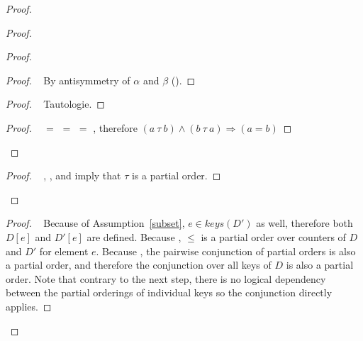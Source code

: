 \documentclass[10pt, oneside]{article}   	%
\begin{document}
\begin{proof}
\begin{proof}
\begin{proof}
				\begin{proof}
					\pf~ By antisymmetry of $\alpha$ and $\beta$ ().
				\end{proof}
				
				\begin{proof}
					\pf~ Tautologie.
				\end{proof}
				
				\qedstep
				\begin{proof}
					\pf~   $=$  $=$  $=$ , therefore $(a ~\tau~ b) \wedge (b ~\tau~ a) \Rightarrow  (a=b)$
				\end{proof}
			\end{proof}
			
			\qedstep
			\begin{proof}
				\pf~ , , and  imply that $\tau$ is a partial order.
			\end{proof}
		\end{proof}
			
			\begin{proof}
				\pf~ Because of Assumption~\ref{subset}, $e \in \textit{keys}(D')$ as well, therefore both $D[e]$ and $D'[e]$ are defined. Because , $\leq$ is a partial order over counters of $D$ and $D'$ for element $e$. Because , the pairwise conjunction of partial orders is also a partial order, and therefore the conjunction over all keys of $D$ is also a partial order. Note that contrary to the next step, there is no logical dependency between the partial orderings of individual keys so the conjunction directly applies.
			\end{proof}
			

\end{proof}
\end{document}
